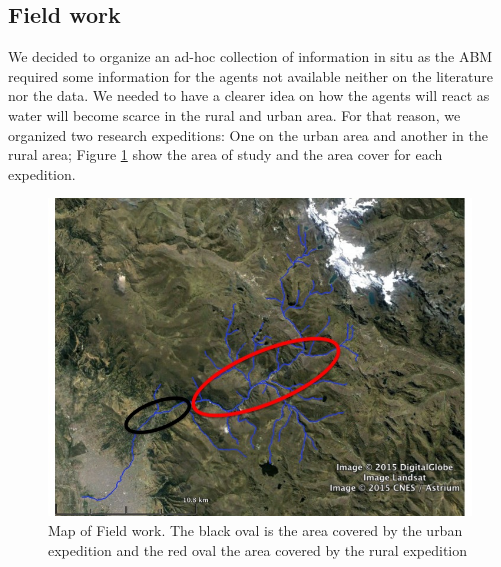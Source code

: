 \documentclass[doc,12pt,floatsintext]{apa7}
\begin{document}
\begin{itemize}

\end{itemize}



\subsection{Field work}

We decided to organize an ad-hoc collection of information in situ as the ABM required some information for the agents not available neither on the literature nor the data. We needed to have a clearer idea on how the agents will react as water will become scarce in the rural and urban area. For that reason, we organized two research expeditions: One on the urban area and another in the rural area; Figure \ref{etno} show the area of study and the area cover for each expedition.

\begin{figure}[h]
  \centering
  \includegraphics[width=0.75\linewidth]{etno}
  \caption[Map of Field work]{Map of Field work. The black oval is the area covered by the urban expedition and the red oval the area covered by the rural expedition}
  \label{etno}
\end{figure}
\end{document}
